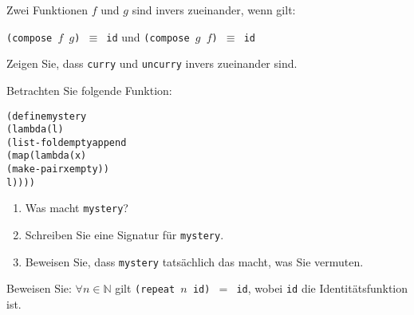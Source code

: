 \begin{aufgabe}
  Zwei Funktionen $f$ und $g$ sind invers
  zueinander, wenn gilt:

  \begin{center}
    \texttt{(compose $f$ $g$) $\equiv$ id} und \texttt{(compose $g$ $f$) $\equiv$ id}
  \end{center}

  Zeigen Sie, dass \texttt{curry} und \texttt{uncurry} invers zueinander sind.
\end{aufgabe}

\begin{aufgabe}
  Betrachten Sie folgende Funktion:

  \begin{alltt}
(define mystery
  (lambda (l)
    (list-fold empty append
               (map (lambda (x)
                      (make-pair x empty))
                    l))))
  \end{alltt}

  \begin{enumerate}
  \item Was macht \texttt{mystery}?

  \item Schreiben Sie eine Signatur für \texttt{mystery}.

  \item Beweisen Sie, dass \texttt{mystery} tatsächlich das macht, was
    Sie vermuten.
  \end{enumerate}
\end{aufgabe}

\begin{aufgabe}
  Beweisen Sie: $\forall n \in \mathbb{N}$ gilt
  \texttt{(repeat $n$ id) $=$ id}, wobei \texttt{id} die
  Identitätsfunktion ist.
\end{aufgabe}

